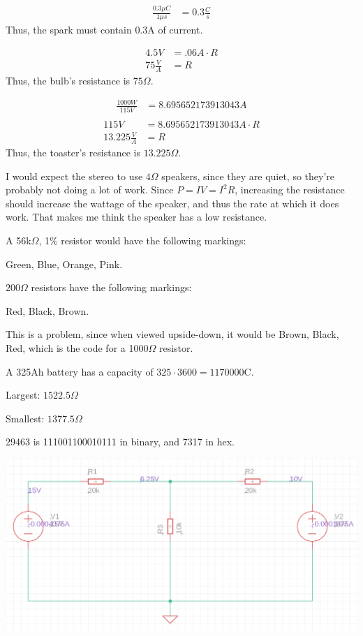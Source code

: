 \documentclass{article}
\begin{document}
\pagecolor{black}
\color{white}

\begin{align*}
    \frac{0.3\mu C}{1\mu s} &= 0.3 \frac Cs
\end{align*} Thus, the spark must contain $0.3$A of current.

\bigskip
{}
\begin{align*}
    4.5V &= .06A \cdot R \\
    75 \frac VA &= R
\end{align*} Thus, the bulb's resistance is $75 \Omega$.

\bigskip
{}
\begin{align*}
    \frac{1000 W}{115 V} &= 8.695652173913043A \\
\end{align*}
\begin{align*}
    115V &= 8.695652173913043A \cdot R \\
    13.225 \frac{V}{A} &= R
\end{align*} Thus, the toaster's resistance is $13.225\Omega$.

\bigskip
{}

    I would expect the stereo to use $4\Omega$ speakers, since they are quiet, so they're probably not doing a lot of work. Since $P= IV = I^2R$, increasing the resistance should increase the wattage of the speaker, and thus the rate at which it does work. That makes me think the speaker has a low resistance.

\bigskip
{}

    A 56k$\Omega$, 1\% resistor would have the following markings:

    Green, Blue, Orange, Pink.

\bigskip
{}

    $200\Omega$ resistors have the following markings:

    Red, Black, Brown.

    This is a problem, since when viewed upside-down, it would be Brown, Black, Red, which is the code for a 1000$\Omega$ resistor.

\bigskip
{}

    A 325Ah battery has a capacity of $325 \cdot 3600 = 1170000$C.

\bigskip
{}

    Largest: $1522.5\Omega$

    Smallest: $1377.5\Omega$

\bigskip
{}

    29463 is 111001100010111 in binary, and 7317 in hex.

\newpage
{}

\begin{center}
    \includegraphics[scale=.5]{hw-1-eagle.png}
\end{center}
\end{document}
